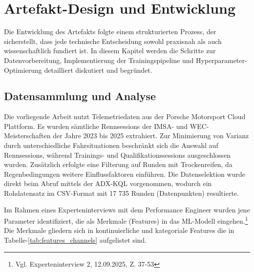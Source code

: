 \chapter{Artefakt-Design und Entwicklung}

Die Entwicklung des Artefakts folgte einem strukturierten Prozess, der sicherstellt, dass jede technische Entscheidung sowohl praxisnah als auch wissenschaftlich fundiert ist. In diesem Kapitel werden die Schritte zur Datenvorbereitung, Implementierung der Trainingspipeline und Hyperparameter-Optimierung detailliert diskutiert und begründet.

\section{Datensammlung und Analyse}

  Die vorliegende Arbeit nutzt Telemetriedaten aus der Porsche Motorsport Cloud Plattform. Es wurden sämtliche Rennsessions der \ac{IMSA}- und \ac{WEC}-Meisterschaften der Jahre 2023 bis 2025 extrahiert. Zur Minimierung von Varianz durch unterschiedliche Fahrsituationen beschränkt sich die Auswahl auf Rennsessions, während Trainings- und Qualifikationssessions ausgeschlossen wurden. Zusätzlich erfolgte eine Filterung auf Runden mit Trockenreifen, da Regenbedingungen weitere Einflussfaktoren einführen. Die Datenselektion wurde direkt beim Abruf mittels der ADX-\ac{KQL} vorgenommen, wodurch ein Rohdatensatz im CSV-Format mit 17 735 Runden (Datenpunkten) resultierte.

  Im Rahmen eines Experteninterviews mit dem Performance Engineer wurden jene Parameter identifiziert, die als Merkmale (Features) in das \ac{ML}-Modell eingehen.\footnote{Vgl. Experteninterview 2, 12.09.2025, Z. 37-53} Die Merkmale gliedern sich in kontinuierliche und kategoriale Features die in Tabelle-\ref{tab:features_channels} aufgelistet sind.



